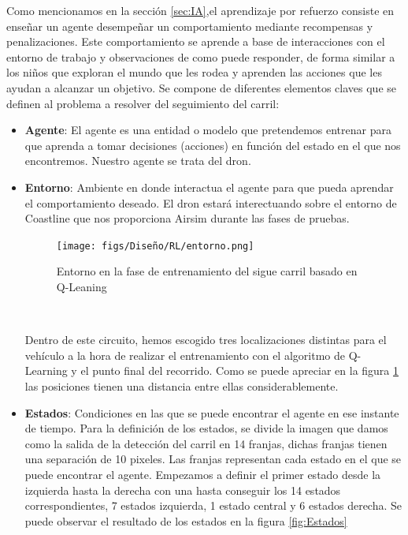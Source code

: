   Como mencionamos en la sección \ref{sec:IA},el aprendizaje por refuerzo consiste en enseñar un agente 
  desempeñar un comportamiento mediante recompensas y penalizaciones. Este comportamiento se aprende a base de interacciones con el entorno de trabajo y observaciones de como puede responder,
  de forma similar a los niños que exploran el mundo que les rodea y aprenden las acciones que les ayudan a alcanzar un objetivo. Se compone de diferentes elementos claves que se definen
  al problema a resolver del seguimiento del carril:
  \begin{itemize} 
    \item \textbf{Agente}: El agente es una entidad o modelo que pretendemos entrenar para que aprenda a tomar decisiones (acciones) en función del estado en el que nos encontremos. Nuestro 
    agente se trata del dron.
    \item \textbf{Entorno}: Ambiente en donde interactua el agente para que pueda aprendar el comportamiento deseado. El dron estará interectuando sobre el entorno de Coastline que nos proporciona Airsim 
    durante las fases de pruebas. 
    \begin{figure} [H]
      \begin{center}
        \texttt{[image: figs/Diseño/RL/entorno.png]}
      \end{center}
      \caption{Entorno en la fase de entrenamiento del sigue carril basado en Q-Leaning}
      \label{fig:Entorno}
    \end{figure}\

    Dentro de este circuito, hemos escogido tres localizaciones distintas para el vehículo a la hora de realizar el entrenamiento con el algoritmo de Q-Learning y el punto final del recorrido. Como se puede apreciar en la figura \ref{fig:Entorno} las posiciones
    tienen una distancia entre ellas considerablemente. 
    \item \textbf{Estados}: Condiciones en las que se puede encontrar el agente en ese instante de tiempo. Para la definición de los estados, se divide la imagen que damos como la salida de la detección del carril en 14 franjas, dichas franjas tienen una 
    separación de 10 pixeles. Las franjas representan cada estado en el que se puede encontrar el agente. Empezamos a definir el primer estado desde la izquierda hasta la derecha con una
    hasta conseguir los 14 estados correspondientes, 7 estados izquierda, 1 estado central y 6 estados derecha. Se puede observar el resultado de los estados en la figura \ref{fig:Estados}


\end{itemize}
